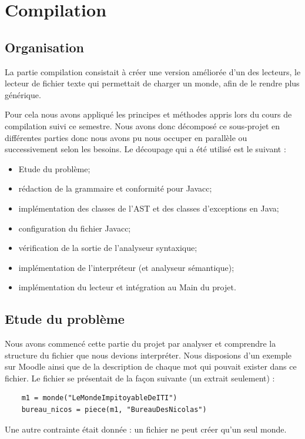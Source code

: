 \chapter{Compilation}

\section{Organisation}
La partie compilation consistait à créer une version améliorée d'un des lecteurs, le lecteur de fichier texte qui permettait de charger un monde, afin de le rendre plus générique.

Pour cela nous avons appliqué les principes et méthodes appris lors du cours de compilation suivi ce semestre. Nous avons donc décomposé ce sous-projet en différentes parties donc nous avons pu nous occuper en parallèle ou successivement selon les besoins. Le découpage qui a été utilisé est le suivant :

\begin{itemize}
	\item Etude du problème;
	\item rédaction de la grammaire et conformité pour Javacc;
	\item implémentation des classes de l'AST et des classes d'exceptions en Java;
	\item configuration du fichier Javacc;
	\item vérification de la sortie de l'analyseur syntaxique;
	\item implémentation de l'interpréteur (et analyseur sémantique);
	\item implémentation du lecteur et intégration au Main du projet.
\end{itemize}

\section{Etude du problème}
Nous avons commencé cette partie du projet par analyser et comprendre la structure du fichier que nous devions interpréter. Nous disposions d'un exemple sur Moodle ainsi que de la description de chaque mot qui pouvait exister dans ce fichier. Le fichier se présentait de la façon suivante (un extrait seulement) :
\begin{verbatim}
	m1 = monde("LeMondeImpitoyableDeITI")
	bureau_nicos = piece(m1, "BureauDesNicolas")
\end{verbatim}

Une autre contrainte était donnée :  un fichier ne peut créer qu'un seul monde. 

